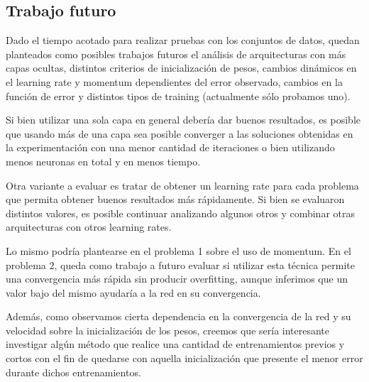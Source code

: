 \documentclass[informe.tex]{subfiles}
\begin{document}
    \subsection{Trabajo futuro}
    
      Dado el tiempo acotado para realizar pruebas con los conjuntos de datos, quedan planteados como posibles trabajos futuros el an\'alisis de arquitecturas con más capas ocultas, distintos criterios de inicializaci\'on de pesos, cambios din\'amicos en el learning rate y momentum dependientes del error observado, cambios en la funci\'on de error y distintos tipos de training (actualmente sólo probamos uno).
      
      Si bien utilizar una sola capa en general debería dar buenos resultados, es posible que usando más de una capa sea posible converger a las soluciones obtenidas en la experimentación con una menor cantidad de iteraciones o bien utilizando menos neuronas en total y en menos tiempo.
      
      Otra variante a evaluar es tratar de obtener un learning rate para cada problema que permita obtener buenos resultados m\'as r\'apidamente. Si bien se evaluaron distintos valores, es posible continuar analizando algunos otros y combinar otras arquitecturas con otros learning rates.
      
      Lo mismo podría plantearse en el problema 1 sobre el uso de momentum. En el problema 2, queda como trabajo a futuro evaluar si utilizar esta técnica permite una convergencia más rápida sin producir overfitting, aunque inferimos que un valor bajo del mismo ayudar\'ia a la red en su convergencia.
      
      Adem\'as, como observamos cierta dependencia en la convergencia de la red y su velocidad sobre la inicializaci\'on de los pesos, creemos que sería interesante investigar alg\'un m\'etodo que realice una cantidad de entrenamientos previos y cortos con el fin de quedarse con aquella inicializaci\'on que presente el menor error durante dichos entrenamientos.
\end{document}
